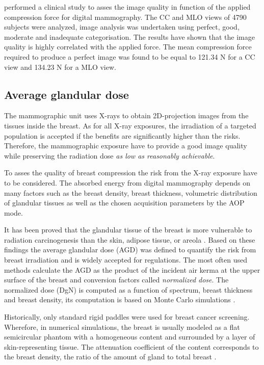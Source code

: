 \cite{oleary_compression_2011} performed a clinical study to asses the image quality in function of the applied compression force for digital mammography. The CC and MLO views of 4790 subjects were analyzed, image analysis was undertaken using perfect, good, moderate and
inadequate categorisation. The results have shown that the image quality is highly correlated with the applied force. The mean compression force required to produce a perfect image was found to be equal to 121.34 N for a CC view and 134.23 N for a MLO view.

\subsection{Average glandular dose}
The mammographic unit uses X-rays to obtain 2D-projection images from the tissues inside the breast. As for all X-ray exposures, the irradiation of a targeted population is accepted if the benefits are significantly higher than the risks. Therefore, the mammographic exposure have to provide a good image quality while preserving the radiation dose \textit{as low as reasonably achievable}.

To asses the quality of breast compression  the risk from the X-ray exposure have to be considered.  The absorbed energy from digital mammography depends on many factors such as the breast density, breast thickness, volumetric  distribution of glandular tissues as well as the chosen acquisition parameters by the AOP mode. 

It has been proved that the glandular tissue of the breast is more vulnerable to radiation carcinogenesis than the skin, adipose tissue, or areola \citep{richard_absorbed_1979}. Based on these findings the average glandular dose (AGD) was defined to quantify the risk from breast irradiation and is widely accepted for regulations.  The most often used methods calculate the AGD as the product of the  incident air kerma at the upper surface of the breast  and  conversion factors called \textit{normalized dose}. The normalized dose (DgN)  is computed as a function of spectrum, breast thickness and breast density,  its computation is based on Monte Carlo simulations \citep{dance_additional_2000,boone_glandular_1999}. 

Historically, only standard rigid paddles were used for breast cancer screening. Wherefore, in numerical simulations, the breast is usually modeled as a flat semicircular phantom with a homogeneous content and surrounded by a layer of skin-representing tissue. The attenuation coefficient of the content corresponds to the breast density, the ratio of the amount of gland to total breast \citep{dance_additional_2000}.

